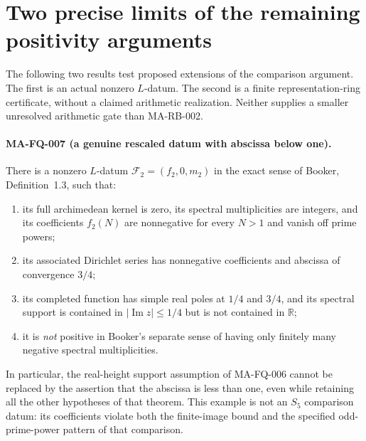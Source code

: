 \section{Two precise limits of the remaining positivity arguments}
\label{sec:s5-scaled-datum}

The following two results test proposed extensions of the comparison
argument.  The first is an actual nonzero $L$-datum.  The second is
a finite representation-ring certificate, without a claimed arithmetic
realization.  Neither supplies a smaller unresolved arithmetic gate
than MA-RB-002.

\paragraph{MA-FQ-007 (a genuine rescaled datum with abscissa below one).}
There is a nonzero $L$-datum $\mathcal F_2=(f_2,0,m_2)$ in the
exact sense of Booker, Definition~1.3, such that:
\begin{enumerate}
\item its full archimedean kernel is zero, its spectral
      multiplicities are integers, and its coefficients $f_2(N)$
      are nonnegative for every $N>1$ and vanish off prime powers;
\item its associated Dirichlet series has nonnegative coefficients
      and abscissa of convergence $3/4$;
\item its completed function has simple real poles at $1/4$ and
      $3/4$, and its spectral support is contained in
      $|\operatorname{Im}z|\le1/4$ but is not contained in
      $\mathbb R$;
\item it is \emph{not} positive in Booker's separate sense of
      having only finitely many negative spectral multiplicities.
\end{enumerate}
In particular, the real-height support assumption of MA-FQ-006
cannot be replaced by the assertion that the abscissa is less
than one, even while retaining all the other hypotheses of that
theorem.  This example is not an $S_5$ comparison datum: its
coefficients violate both the finite-image bound and the specified
odd-prime-power pattern of that comparison.


